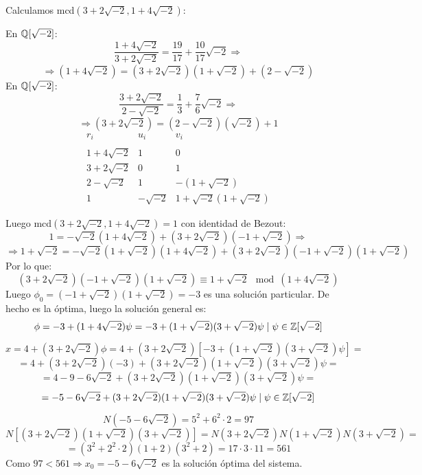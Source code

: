 \documentclass[12pt]{article}
\begin{document}
\begin{ejercicio}[2.5 puntos]
        \newpage
        \noindent
        Calculamos mcd$(3+2\sqrt{-2}, 1+4\sqrt{-2})$:

        \noindent
        En $\mathbb{Q}[\sqrt{-2}]$:
        $$\dfrac{1+4\sqrt{-2}}{3+2\sqrt{-2}} = \dfrac{19}{17} + \dfrac{10}{17}\sqrt{-2} \Rightarrow$$
        $$\Rightarrow (1+4\sqrt{-2}) = (3+2\sqrt{-2})(1+\sqrt{-2}) + (2-\sqrt{-2})$$
        En $\mathbb{Q}[\sqrt{-2}]$:
        $$\dfrac{3+2\sqrt{-2}}{2-\sqrt{-2}} = \dfrac{1}{3} + \dfrac{7}{6}\sqrt{-2} \Rightarrow$$
        $$\Rightarrow (3+2\sqrt{-2}) = (2-\sqrt{-2})(\sqrt{-2})+1$$
        \begin{equation*}
        \begin{array}{rcl}
            r_i & u_i & v_i \\ \\
            1+4\sqrt{-2} & 1 & 0 \\
            3+2\sqrt{-2} & 0 & 1 \\
            2-\sqrt{-2} & 1 & -(1+\sqrt{-2}) \\
            1 & -\sqrt{-2} & 1+\sqrt{-2}(1+\sqrt{-2})
        \end{array}
        \end{equation*}

        \noindent
        Luego mcd$(3+2\sqrt{-2}, 1+4\sqrt{-2})=1$ con identidad de Bezout:
        $$1 = -\sqrt{-2}(1+4\sqrt{-2}) + (3+2\sqrt{-2})(-1+\sqrt{-2}) \Rightarrow$$
        $$\Rightarrow 1+\sqrt{-2} = -\sqrt{-2}(1+\sqrt{-2})(1+4\sqrt{-2}) + (3+2\sqrt{-2})(-1+\sqrt{-2})(1+\sqrt{-2})$$
        Por lo que:
        $$(3+2\sqrt{-2})(-1+\sqrt{-2})(1+\sqrt{-2}) \equiv 1+\sqrt{-2} \mod (1+4\sqrt{-2})$$
        Luego $\phi_0 = (-1+\sqrt{-2})(1+\sqrt{-2}) = -3$ es una solución particular.\newline
        De hecho es la óptima, luego la solución general es:
        $$\phi = -3 + (1+4\sqrt{-2})\psi = -3 + (1+\sqrt{-2})(3+\sqrt{-2})\psi \mid \psi \in \mathbb{Z}[\sqrt{-2}]$$

        $$x = 4+(3+2\sqrt{-2})\phi = 4+(3+2\sqrt{-2})[-3+(1+\sqrt{-2})(3+\sqrt{-2})\psi] = $$
        $$ = 4+(3+2\sqrt{-2})(-3) + (3+2\sqrt{-2})(1+\sqrt{-2})(3+\sqrt{-2})\psi = $$
        $$ = 4-9-6\sqrt{-2} + (3+2\sqrt{-2})(1+\sqrt{-2})(3+\sqrt{-2})\psi = $$
        $$ = -5-6\sqrt{-2} + (3+2\sqrt{-2})(1+\sqrt{-2})(3+\sqrt{-2})\psi \mid \psi \in \mathbb{Z}[\sqrt{-2}]$$


        $$N(-5-6\sqrt{-2}) = 5^2 + 6^2 \cdot 2 = 97$$
        $$N[(3+2\sqrt{-2})(1+\sqrt{-2})(3+\sqrt{-2})] = N(3+2\sqrt{-2})N(1+\sqrt{-2})N(3+\sqrt{-2}) = $$
        $$= (3^2 + 2^2 \cdot 2)(1+2)(3^2 + 2) = 17 \cdot 3 \cdot 11 = 561$$
        Como $97 < 561 \Rightarrow x_0 = -5-6\sqrt{-2}$ es la solución óptima del sistema.\\


\end{ejercicio}
\end{document}
